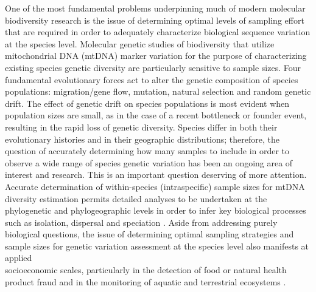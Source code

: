 One of the most fundamental problems underpinning much of modern molecular \\ biodiversity research is the issue of determining optimal levels of sampling effort that are required in order to adequately characterize biological sequence variation at the species level. Molecular genetic studies of biodiversity that utilize mitochondrial DNA (mtDNA) marker variation for the purpose of characterizing existing species genetic diversity are particularly sensitive to sample sizes. Four fundamental evolutionary forces act to alter the genetic composition of species populations: migration/gene flow, mutation, natural selection and random genetic drift. The effect of genetic drift on species populations is most evident when population sizes are small, as in the case of a recent bottleneck or founder event, resulting in the rapid loss of genetic diversity. Species differ in both their evolutionary histories and in their geographic distributions; therefore, the question of accurately determining how many samples to include in order to observe a wide range of species genetic variation has been an ongoing area of interest and research. This is an important question deserving of more attention. Accurate determination of within-species (intraspecific) sample sizes for mtDNA diversity estimation permits detailed analyses to be undertaken at the phylogenetic and phylogeographic levels in order to infer key biological processes such as isolation, dispersal and speciation \cite{avise1987intraspecific, dixon2006means, funk2003species}. Aside from addressing purely biological questions, the issue of determining optimal sampling strategies and \\ sample sizes for genetic variation assessment at the species level also manifests at applied \\ socioeconomic scales, particularly in the detection of food or natural health product fraud and in the monitoring of aquatic and terrestrial ecosystems \cite{hunter2015environmental}.

\vspace{5mm}

